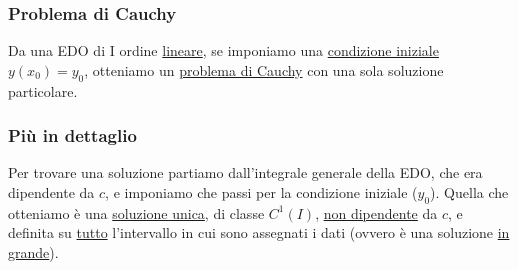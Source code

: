 \newpage
\subsubsection{Problema di Cauchy}

Da una EDO di I ordine \underline{lineare}, se imponiamo una \underline{condizione iniziale} \(y(x_0) = y_0\), otteniamo un \underline{problema di Cauchy} con una sola soluzione particolare.


\subsubsection*{Più in dettaglio}

Per trovare una soluzione partiamo dall'integrale generale della EDO, che era dipendente da \(c\), e imponiamo che passi per la condizione iniziale (\(y_0\)). Quella che otteniamo è una \underline{soluzione unica}, di classe \(C^1(I)\), \underline{non dipendente} da \(c\), e definita su \underline{tutto} l'intervallo in cui sono assegnati i dati (ovvero è una soluzione \underline{in grande}).

